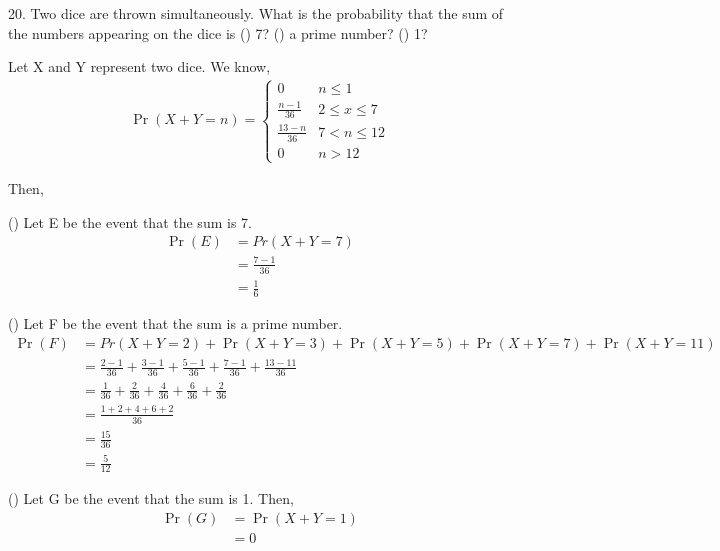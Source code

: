 \documentclass[]{article}
\begin{document}
\let\vec\mathbf

20. Two dice are thrown simultaneously. What is the probability that the sum of the numbers appearing on the dice is () 7? () a prime number? () 1?

\solution Let X and Y represent two dice. We know,
\begin{align}
\Pr(X+Y=n) = 
\begin{cases}
0 &  n \leq{1} \\
\frac{n-1}{36} &  2 \leq{x} \leq{7} \\
\frac{13-n}{36} &  7 < n \leq{12} \\
0 &  n>12
\end{cases}
\end{align}

Then,

() Let E be the event that the sum is 7.
\begin{align}
\Pr(E) &= Pr(X+Y=7) \\
&= \frac{7-1}{36} \\
&= \frac{1}{6}
\end{align}

() Let F be the event that the sum is a prime number.
\begin{align}
\Pr(F) &= Pr(X+Y=2) + \Pr(X+Y=3) + \Pr(X+Y=5) + \Pr(X+Y=7) + \Pr(X+Y=11) \\
&= \frac{2-1}{36} + \frac{3-1}{36} + \frac{5-1}{36} + \frac{7-1}{36} + \frac{13-11}{36} \\
&= \frac{1}{36} + \frac{2}{36} + \frac{4}{36} + \frac{6}{36} + \frac{2}{36} \\
&= \frac{1+2+4+6+2}{36} \\
&= \frac{15}{36} \\
&= \frac{5}{12}
\end{align}

() Let G be the event that the sum is 1. Then,
\begin{align}
\Pr(G) &= \Pr(X+Y=1) \\
&= 0
\end{align}
\end{document}
